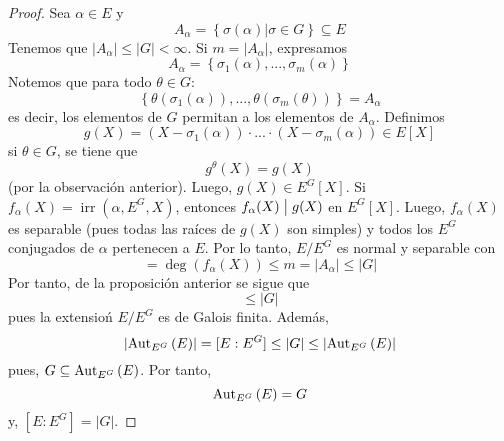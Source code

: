 \documentclass[12pt]{report}
\theoremstyle{largebreak}
\newcommand\abs[1]{\ensuremath{\left|#1\right|}}
\newcommand\divides{\ensuremath{\bigm|}}
\DeclareMathOperator{\irr}{irr}
\begin{document}
    \begin{proof}
        Sea $\alpha\in E$ y
        \begin{equation*}
            A_\alpha=\left\{\sigma(\alpha)\Big|\sigma\in G \right\}\subseteq E
        \end{equation*}
        Tenemos que $\abs{A_\alpha}\leq\abs{G}<\infty$. Si $m=\abs{A_\alpha}$, expresamos
        \begin{equation*}
            A_\alpha=\left\{\sigma_1(\alpha),...,\sigma_m(\alpha)\right\}
        \end{equation*}
        Notemos que para todo $\theta\in G$:
        \begin{equation*}
            \left\{\theta(\sigma_1(\alpha)),...,\theta(\sigma_m(\theta)) \right\}=A_\alpha
        \end{equation*}
        es decir, los elementos de $G$ permitan a los elementos de $A_\alpha$. Definimos
        \begin{equation*}
            g(X)=(X-\sigma_1(\alpha))\cdot...\cdot(X-\sigma_m(\alpha))\in E[X]
        \end{equation*}
        si $\theta\in G$, se tiene que
        \begin{equation*}
            g^\theta(X)=g(X)
        \end{equation*}
        (por la observación anterior). Luego, $g(X)\in E^G[X]$. Si $f_\alpha(X)=\irr(\alpha,E^G,X)$, entonces $f_\alpha(X)\divides g(X)$ en $E^G[X]$. Luego, $f_\alpha(X)$ es separable (pues todas las raíces de $g(X)$ son simples) y todos los $E^G$ conjugados de $\alpha$ pertenecen a $E$. Por lo tanto, $E/E^G$ es normal y separable con
        \begin{equation*}
            [E^G(\alpha):E^G]=\deg(f_\alpha(X))\leq m=\abs{A_\alpha}\leq\abs{G}
        \end{equation*}
        Por tanto, de la proposición anterior se sigue que
        \begin{equation*}
            [E:E^G]\leq\abs{G}
        \end{equation*}
        pues la extensioń $E/E^G$ es de Galois finita. Además,
        \begin{equation*}
            \abs{\Aut{E^G}{E}}=[E:E^G]\leq\abs{G}\leq\abs{\Aut{E^G}{E}}
        \end{equation*}
        pues, $G\subseteq \textup{Aut}_{E^G}\left(E\right)$. Por tanto,
        \begin{equation*}
            \textup{Aut}_{E^G}\left(E\right)=G
        \end{equation*}
        y, $[E:E^G]=\abs{G}$.
    \end{proof}
\end{document}
